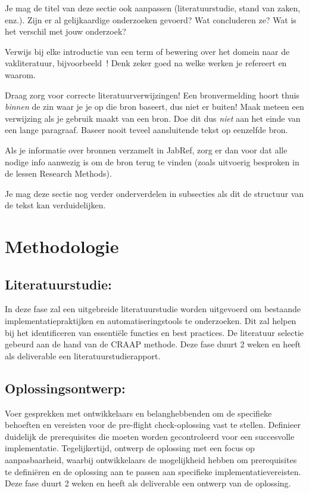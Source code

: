 Je mag de titel van deze sectie ook aanpassen (literatuurstudie, stand van zaken, enz.). Zijn er al gelijkaardige onderzoeken gevoerd? Wat concluderen ze? Wat is het verschil met jouw onderzoek?

Verwijs bij elke introductie van een term of bewering over het domein naar de vakliteratuur, bijvoorbeeld~\autocite{Hykes2013}! Denk zeker goed na welke werken je refereert en waarom.

Draag zorg voor correcte literatuurverwijzingen! Een bronvermelding hoort thuis \emph{binnen} de zin waar je je op die bron baseert, dus niet er buiten! Maak meteen een verwijzing als je gebruik maakt van een bron. Doe dit dus \emph{niet} aan het einde van een lange paragraaf. Baseer nooit teveel aansluitende tekst op eenzelfde bron.

Als je informatie over bronnen verzamelt in JabRef, zorg er dan voor dat alle nodige info aanwezig is om de bron terug te vinden (zoals uitvoerig besproken in de lessen Research Methods).


Je mag deze sectie nog verder onderverdelen in subsecties als dit de structuur van de tekst kan verduidelijken.

\section{Methodologie}%
\label{sec:methodologie}
\subsection{Literatuurstudie:}
In deze fase zal een uitgebreide literatuurstudie worden uitgevoerd om bestaande implementatiepraktijken en automatiseringstools te onderzoeken. Dit zal helpen bij het identificeren van essentiële functies en best practices. De literatuur selectie gebeurd aan de hand van de CRAAP methode. Deze fase duurt 2 weken en heeft als deliverable een literatuurstudierapport.

\subsection{Oplossingsontwerp: }
Voer gesprekken met ontwikkelaars en belanghebbenden om de specifieke behoeften en vereisten voor de pre-flight check-oplossing vast te stellen. Definieer duidelijk de prerequisites die moeten worden gecontroleerd voor een succesvolle implementatie. Tegelijkertijd, ontwerp de oplossing met een focus op aanpasbaarheid, waarbij ontwikkelaars de mogelijkheid hebben om prerequisites te definiëren en de oplossing aan te passen aan specifieke implementatievereisten. Deze fase duurt 2 weken en heeft als deliverable een ontwerp van de oplossing.

